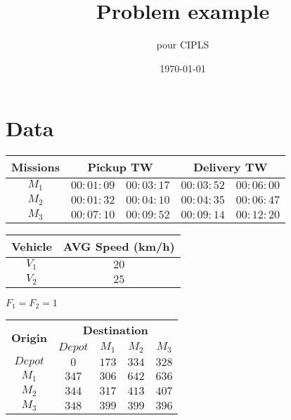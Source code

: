 \documentclass[a4paper,12pt]{article}
\title{Problem example}
\author{pour CIPLS}
\date{\today}
\begin{document}

\section{Data}
\tiny
 \begin{center}
    \begin{tabular}{|c|c|c|c|c|} 
    \hline
    {\bf Missions} & \multicolumn{2}{|c|}{\bf Pickup TW} & \multicolumn{2}{|c|}{\bf Delivery TW} \\ \hline
    $M_1$	 & $00:01:09$ & $00:03:17$	& $00:03:52$ & $00:06:00$\\
    $M_2$	 & $00:01:32$ & $00:04:10$	& $00:04:35$ & $00:06:47$\\
    $M_3$	 & $00:07:10$ & $00:09:52$	& $00:09:14$ & $00:12:20$\\
    \hline

    \end{tabular}
\end{center}
\begin{center}
    \begin{tabular}{|c|c|} 
    \hline
    {\bf Vehicle} & {\bf AVG Speed (km/h)} \\ \hline
    $V_1$	 & $20$\\
    $V_2$	 & $25$\\
    
    \hline

    \end{tabular}
  \end{center}
  
  \begin{center}
   $F_1 = F_2 = 1$
  \end{center}

  
  \begin{center}
    \begin{tabular}{|c|c|c|c|c|} 
    \hline
    \multirow{2}{*}{\bf{Origin}} & \multicolumn{4}{c|}{\bf{Destination}}\\ \cline{2-5}
    	 	& {\bf $Depot$}	& {\bf $M_1$}	& $M_2$		& $M_3$\\ \hline
    {\bf $Depot$}	& $0$		& $173$		& $334$		& $328$\\
    {\bf $M_1$}		& $347$		& $306$		& $642$		& $636$\\
    {\bf $M_2$}		& $344$		& $317$		& $413$		& $407$\\
    {\bf $M_3$}		& $348$		& $399$		& $399$		& $396$\\
    \hline
    \end{tabular}

  \end{center}
\end{document}
